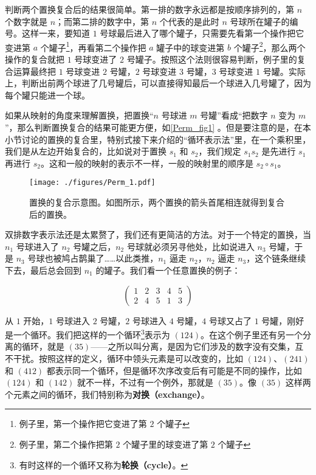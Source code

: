 判断两个置换复合后的结果很简单。第一排的数字永远都是按顺序排列的，第 $n$ 个数字就是 $n$；而第二排的数字中，第 $n$ 个代表的是此时 $n$ 号球所在罐子的编号。这样一来，要知道 $1$ 号球最后进入了哪个罐子，只需要先看第一个操作把它变进第 $a$ 个罐子\footnote{例子里，第一个操作把它变进了第 $2$ 个罐子}，再看第二个操作把 $a$ 罐子中的球变进第 $b$ 个罐子\footnote{例子里，第二个操作把第 $2$ 个罐子里的球变进了第 $2$ 个罐子}，那么两个操作的复合就把 $1$ 号球变进了 $2$ 号罐子。按照这个法则很容易判断，例子里的复合运算最终把 $1$ 号球变进 $2$ 号罐，$2$ 号球变进 $3$ 号罐，$3$ 号球变进 $1$ 号罐。实际上，判断出前两个球进了几号罐后，可以直接得知最后一个球进入几号罐了，因为每个罐只能进一个球。

如果从映射的角度来理解置换，把置换“$n$ 号球进 $m$ 号罐”看成“把数字 $n$ 变为 $m$”，那么判断置换复合的结果可能更方便，如\autoref{Perm_fig1} 。但是要注意的是，在本小节讨论的置换的复合里，特别式接下来介绍的“循环表示法”里，在一个乘积里，我们是从左边开始复合的，比如说对于置换 $s_1$ 和 $s_2$，我们规定 $s_1s_2$ 是先进行 $s_1$ 再进行 $s_2$。这和一般的映射的表示不一样，一般的映射里的顺序是 $s_2\circ s_1$。






\begin{figure}[ht]
\centering
\texttt{[image: ./figures/Perm\_1.pdf]}
\caption{置换的复合示意图。如图所示，两个置换的箭头首尾相连就得到复合后的置换。} \label{Perm_fig1}
\end{figure}


双排数字表示法还是太累赘了，我们还有更简洁的方法。对于一个特定的置换，当 $n_1$ 号球进入了 $n_2$ 号罐之后，$n_2$ 号球就必须另寻他处，比如说进入 $n_3$ 号罐，于是 $n_3$ 号球也被鸠占鹊巢了……以此类推，$n_1$ 逼走 $n_2$，$n_2$ 逼走 $n_3$，这个链条继续下去，最后总会回到 $n_1$ 的罐子。我们看一个任意置换的例子：

\begin{equation}\label{Perm_eq1}\begin{pmatrix}
1&2&3&4&5\\2&4&5&1&3
\end{pmatrix}\end{equation}

从 $1$ 开始，$1$ 号球进入 $2$ 号罐，$2$ 号球进入 $4$ 号罐，$4$ 号球又占了 $1$ 号罐，刚好是一个循环。我们把这样的一个循环\footnote{有时这样的一个循环又称为\textbf{轮换（cycle）}。}表示为 $(1 2 4)$。在这个例子里还有另一个分离的循环，就是 $(3 5)$——之所以叫分离，是因为它们涉及的数字没有交集，互不干扰。按照这样的定义，循环中领头元素是可以改变的，比如 $(1 2 4)$、$(2 4 1)$ 和 $(4 1 2)$ 都表示同一个循环，但是循环次序改变后有可能是不同的操作，比如 $(1 2 4)$ 和 $(1 4 2)$ 就不一样，不过有一个例外，那就是 $(3 5)$。像 $(3 5)$ 这样两个元素之间的循环，我们特别称为\textbf{对换（exchange）}。

